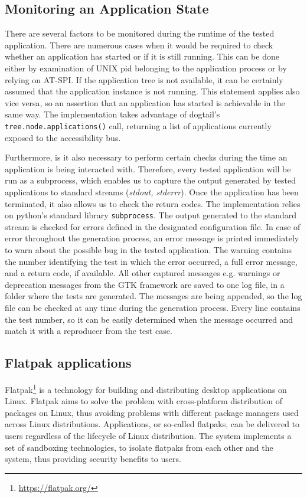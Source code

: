 \subsection{Monitoring an Application State}
There are several factors to be monitored during the runtime of the tested application. There are numerous cases when it would be required to check whether an application has started or if it is still running. This can be done either by examination of UNIX pid belonging to the application process or by relying on AT-SPI. If the application tree is not available, it can be certainly assumed that the application instance is not running. This statement applies also vice versa, so an assertion that an application has started is achievable in the same way. The implementation takes advantage of dogtail's \texttt{tree.node.applications()} call, returning a list of applications currently exposed to the accessibility bus.

Furthermore, is it also necessary to perform certain checks during the time an application is being interacted with. Therefore, every tested application will be run as a subprocess, which enables us to capture the output generated by tested applications to standard streams (\textit{stdout, stderrr}). Once the application has been terminated, it also allows us to check the return codes. The implementation relies on python's standard library \texttt{subprocess}. The output generated to the standard stream is checked for errors defined in the designated configuration file. In case of error throughout the generation process, an error message is printed immediately to warn about the possible bug in the tested application. The warning contains the number identifying the test in which the error occurred, a full error message, and a return code, if available. All other captured messages e.g. warnings or deprecation messages from the GTK framework are saved to one log file, in a folder where the tests are generated. The messages are being appended, so the log file can be checked at any time during the generation process. Every line contains the test number, so it can be easily determined when the message occurred and match it with a reproducer from the test case.

\subsection{Flatpak applications}
Flatpak\footnote{\url{https://flatpak.org/}} is a technology for building and distributing desktop applications on Linux. Flatpak aims to solve the problem with cross-platform distribution of packages on Linux, thus avoiding problems with different package managers used across Linux distributions. Applications, or so-called flatpaks, can be delivered to users regardless of the lifecycle of Linux distribution. The system implements a set of sandboxing technologies, to isolate flatpaks from each other and the system, thus providing security benefits to users.\cite{flatpak}

